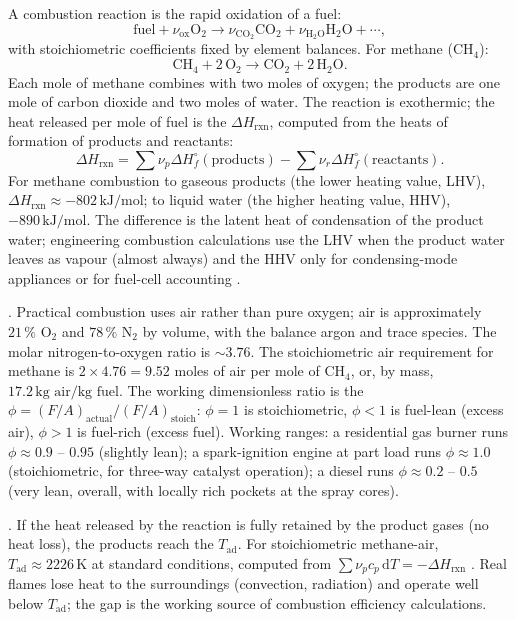 A combustion reaction is the rapid oxidation of a fuel:
\[
\text{fuel} + \nu_{\text{ox}} \text{O}_2 \to
\nu_{\text{CO}_2} \text{CO}_2 + \nu_{\text{H}_2\text{O}} \text{H}_2\text{O}
+ \cdots,
\]
with stoichiometric coefficients fixed by element balances. For methane
($\text{CH}_4$):
\[
\text{CH}_4 + 2\,\text{O}_2 \to \text{CO}_2 + 2\,\text{H}_2\text{O}.
\]
Each mole of methane combines with two moles of oxygen; the products
are one mole of carbon dioxide and two moles of water. The reaction is
exothermic; the heat released per mole of fuel is the
 $\Delta H_{\text{rxn}}$, computed from
the heats of formation of products and reactants:
\[
\Delta H_{\text{rxn}} = \sum \nu_p \Delta H_f^\circ(\text{products}) -
\sum \nu_r \Delta H_f^\circ(\text{reactants}).
\]
For methane combustion to gaseous products (the lower heating value,
LHV), $\Delta H_{\text{rxn}} \approx -802\,\text{kJ}/\text{mol}$; to
liquid water (the higher heating value, HHV), $-890\,\text{kJ}/\text{mol}$.
The difference is the latent heat of condensation of the product
water; engineering combustion calculations use the LHV when the
product water leaves as vapour (almost always) and the HHV only for
condensing-mode appliances or for fuel-cell accounting
\cite[ch.~2]{text:turns-combustion}.

. Practical combustion uses
air rather than pure oxygen; air is approximately $21\,\%$ O$_2$ and
$78\,\%$ N$_2$ by volume, with the balance argon and trace species.
The molar nitrogen-to-oxygen ratio is $\sim 3.76$. The stoichiometric
air requirement for methane is $2 \times 4.76 = 9.52$ moles of air per
mole of CH$_4$, or, by mass, $17.2\,\text{kg air}/\text{kg fuel}$. The
working dimensionless ratio is the 
$\phi = (F/A)_{\text{actual}} / (F/A)_{\text{stoich}}$: $\phi = 1$ is
stoichiometric, $\phi < 1$ is fuel-lean (excess air), $\phi > 1$ is
fuel-rich (excess fuel). Working ranges: a residential gas burner runs
$\phi \approx 0.9$ -- $0.95$ (slightly lean); a spark-ignition engine
at part load runs $\phi \approx 1.0$ (stoichiometric, for three-way
catalyst operation); a diesel runs $\phi \approx 0.2$ -- $0.5$ (very
lean, overall, with locally rich pockets at the spray cores).

. If the heat released by the
reaction is fully retained by the product gases (no heat loss), the
products reach the  $T_{\text{ad}}$.
For stoichiometric methane-air, $T_{\text{ad}} \approx 2226\,\si{\kelvin}$
at standard conditions, computed from $\sum \nu_p c_p \,\mathrm{d}T =
-\Delta H_{\text{rxn}}$ \cite[ch.~2]{text:turns-combustion}. Real
flames lose heat to the surroundings (convection, radiation) and
operate well below $T_{\text{ad}}$; the gap is the working source of
combustion efficiency calculations.

